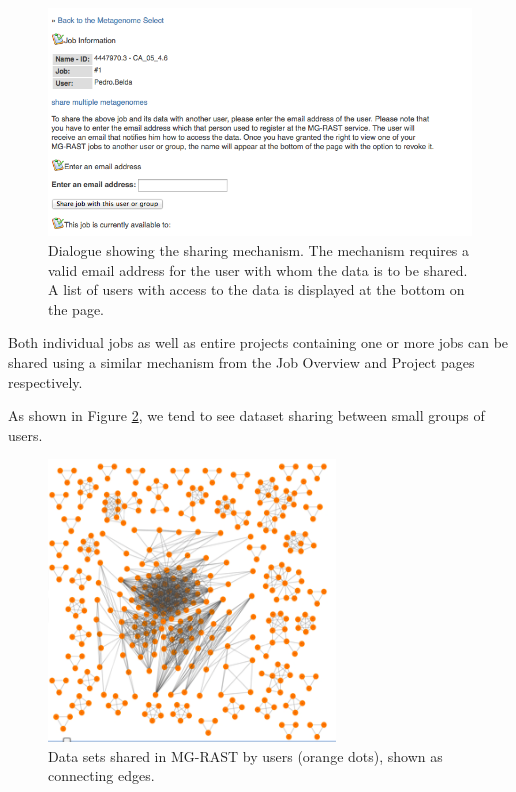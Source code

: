\documentclass[12pt,fullpage]{report}
\begin{document}
\begin{figure}
\begin{center}
\includegraphics[width=6in]{Images/sharing}
\end{center}
\caption{
Dialogue showing the sharing mechanism.
The mechanism requires a valid email address for the user with whom the data is to be shared. A list of users with access to the data is displayed at the bottom on the page.
}
\label{fig:sharing}
\end{figure}

Both individual jobs as well as entire projects containing one or more jobs can be shared using a similar mechanism from the Job Overview and Project pages respectively.

As shown in Figure \ref{fig:Data-sharing-in-mg-rast}, we tend to see dataset sharing between small groups of users.

\begin{figure}
\begin{center}
\includegraphics[width=3in]{Images/Data-sharing-in-mg-rast}
\end{center}
\caption{
Data sets shared in MG-RAST by users (orange dots), shown as connecting edges.
}
\label{fig:Data-sharing-in-mg-rast}
\end{figure}
\end{document}
